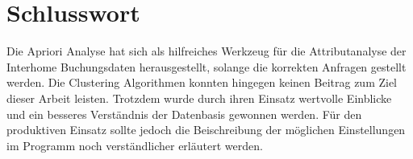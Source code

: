 \section{Schlusswort}
Die Apriori Analyse hat sich als hilfreiches Werkzeug für die Attributanalyse der Interhome Buchungsdaten herausgestellt, solange die korrekten Anfragen gestellt werden. Die Clustering Algorithmen konnten hingegen keinen Beitrag zum Ziel dieser Arbeit leisten. Trotzdem wurde durch ihren Einsatz wertvolle Einblicke und ein besseres Verständnis der Datenbasis gewonnen werden. Für den produktiven Einsatz sollte jedoch die Beischreibung der möglichen Einstellungen im Programm noch verständlicher erläutert werden. 